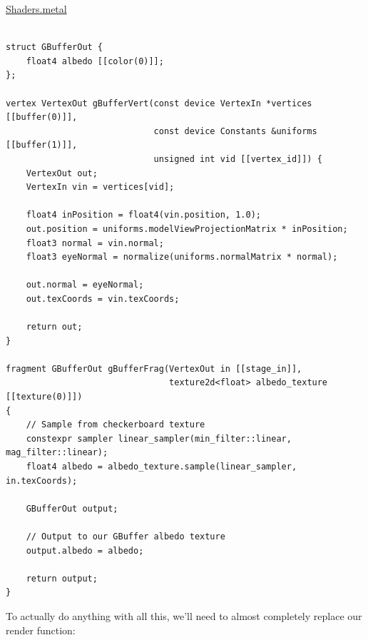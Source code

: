 \documentclass[11pt]{article}
\begin{document}
\uline{Shaders.metal}
\begin{verbatim}

struct GBufferOut {
    float4 albedo [[color(0)]];
};

vertex VertexOut gBufferVert(const device VertexIn *vertices [[buffer(0)]],
                             const device Constants &uniforms [[buffer(1)]],
                             unsigned int vid [[vertex_id]]) {
    VertexOut out;
    VertexIn vin = vertices[vid];

    float4 inPosition = float4(vin.position, 1.0);
    out.position = uniforms.modelViewProjectionMatrix * inPosition;
    float3 normal = vin.normal;
    float3 eyeNormal = normalize(uniforms.normalMatrix * normal);

    out.normal = eyeNormal;
    out.texCoords = vin.texCoords;

    return out;
}

fragment GBufferOut gBufferFrag(VertexOut in [[stage_in]],
                                texture2d<float> albedo_texture [[texture(0)]])
{
    // Sample from checkerboard texture
    constexpr sampler linear_sampler(min_filter::linear, mag_filter::linear);
    float4 albedo = albedo_texture.sample(linear_sampler, in.texCoords);

    GBufferOut output;

    // Output to our GBuffer albedo texture
    output.albedo = albedo;

    return output;
}
\end{verbatim}

To actually do anything with all this, we'll need to almost completely replace
our render function:
\end{document}
